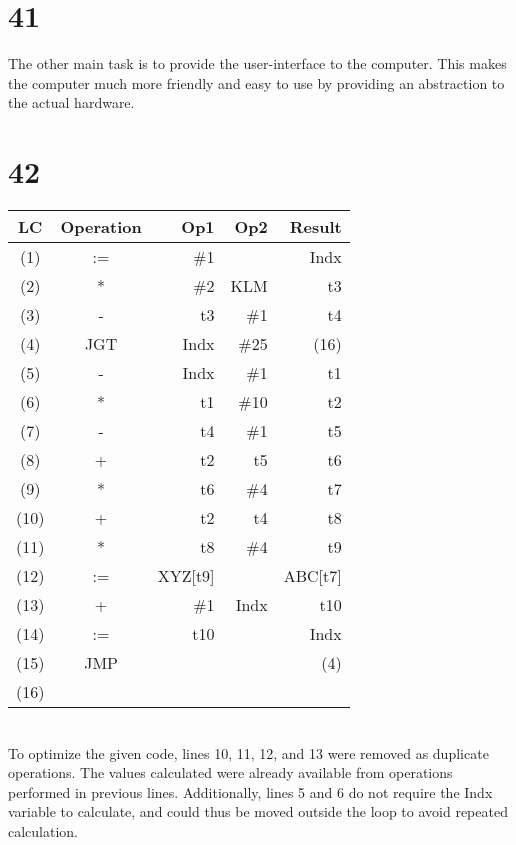 \documentclass[a4paper,11pt]{article}
\begin{document}
\section*{41}
The other main task is to provide the user-interface to the computer.  This makes the computer much more friendly and easy to use by providing an abstraction to the actual hardware.  


\section*{42}
\begin{tabular}{ | c | c | r | r | r |}
  \hline
    LC & Operation & Op1 & Op2 & Result  \\ \hline
    (1) & := & \#1 &  & Indx \\ \hline
    (2) & * & \#2 & KLM & t3 \\ \hline
    (3) & - & t3 & \#1 & t4 \\ \hline
    (4) & JGT & Indx & \#25 & (16) \\ \hline
    (5) & - & Indx & \#1 & t1 \\ \hline
    (6) & * & t1 & \#10 & t2 \\ \hline
    (7) & - & t4 & \#1 & t5 \\ \hline
    (8) & + & t2 & t5 & t6 \\ \hline
    (9) & * & t6 & \#4 & t7 \\ \hline
    (10) & + & t2 & t4 & t8 \\ \hline
    (11) & * & t8 & \#4 & t9 \\ \hline
    (12) & := & XYZ[t9] &  & ABC[t7] \\ \hline
    (13) & + & \#1 & Indx & t10 \\ \hline
    (14) & := & t10 &   & Indx \\ \hline
    (15) & JMP &  &   & (4) \\ \hline
    (16) &   &    &    &    \\ \hline
\end{tabular} \\

To optimize the given code, lines 10, 11, 12, and 13 were removed as duplicate operations.  The values calculated were already available from operations performed in previous lines.  Additionally, lines 5 and 6 do not require the Indx variable to calculate, and could thus be moved outside the loop to avoid repeated calculation.  
\end{document}
